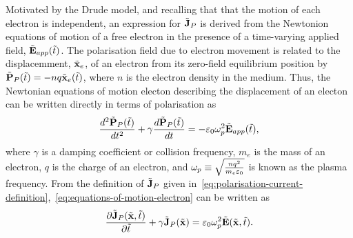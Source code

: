 Motivated by the Drude model, and recalling that that the motion of each
electron is independent, an expression for $\tilde{\mathbf{J}}_P$ is derived from the
Newtonion equations of motion of a free electron in the presence of a
time-varying applied field, $\tilde{\mathbf{E}}_{app}(\tilde{t})$. The polarisation field due to electron movement is related to the displacemment,
$\tilde{\mathbf{x}}_e$, of an electron from its zero-field equilibrium position by $
\tilde{\mathbf{P}}_P(\tilde{t}) = - n q \tilde{\mathbf{x}}_e(\tilde{t}) $, where $n$ is the
electron density in the medium. Thus, the Newtonian equations of motion electon
describing the displacement of an electon can be written directly in terms of
polarisation as
\begin{equation}
  \label{eq:equations-of-motion-electron}
  \frac{d^2 \tilde{\mathbf{P}}_P(\tilde{t}) }{dt^2} + \gamma \frac{d \tilde{\mathbf{P}}_P(\tilde{t}) }{dt} = - \varepsilon_0 \omega_p^2 \tilde{\mathbf{E}}_{app}(\tilde{t}),
\end{equation}
where $\gamma$ is a damping coefficient or collision frequency, $m_e$ is the
mass of an electron, $q$ is the charge of an electron, and $\omega_p \equiv
\sqrt{\frac{n q^2}{m_e \varepsilon_0}}$ is known as the plasma frequency.
From the definition of $\tilde{\mathbf{J}}_P$ given
in~\eqref{eq:polarisation-current-definition},~\eqref{eq:equations-of-motion-electron} 
can be written as
\begin{equation}
  \frac{\partial \tilde{\mathbf{J}}_P(\tilde{\mathbf{x}},\tilde{t})}{\partial \tilde{t} } + \gamma \tilde{\mathbf{J}}_P(\tilde{\mathbf{x}}) = \varepsilon_0 \omega_p^2 \tilde{\mathbf{E}}(\tilde{\mathbf{x}},\tilde{t}).
  \label{eq:pol-current-ADE}
\end{equation}

